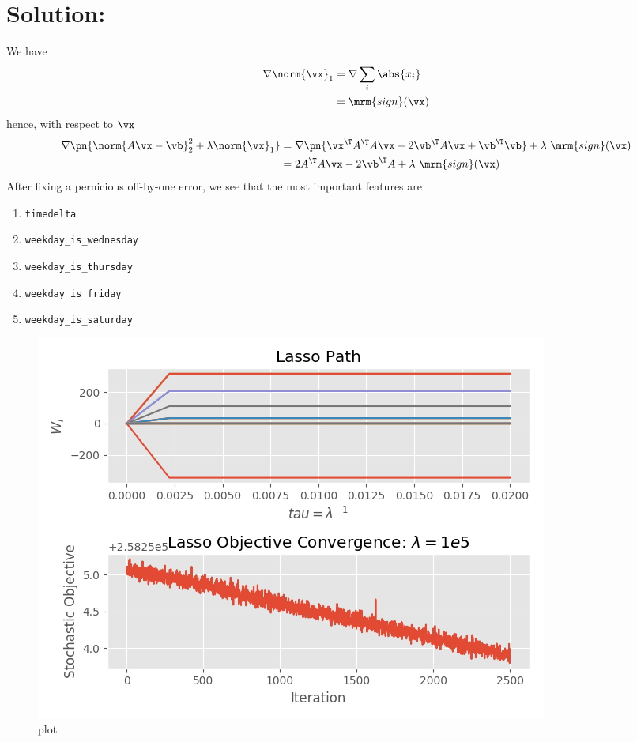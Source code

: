 \documentclass[189]{pset}
\begin{document}
  \hrulefill

  \section*{Solution:}
    We have
    \begin{align*}
      \nabla \norm{\vx}_1
      &= \nabla \sum_{i} \abs{x_i} \\
      &= \mrm{sign} (\vx)
    \end{align*}
    hence, with respect to $\vx$
    \begin{align*}
      \nabla \pn{\norm{A\vx - \vb}_2^2 + \lambda \norm{\vx}_1}
      &= \nabla \pn{\vx^\T A^\T A \vx - 2\vb^\T A \vx + \vb^\T \vb} +
        \lambda \ \mrm{sign}(\vx) \\
      &= 2 A^\T A \vx - 2\vb^\T A + \lambda\ \mrm{sign}(\vx)
    \end{align*}
    After fixing a pernicious off-by-one error, we see that the most
    important features are
    \begin{enumerate}[label=\arabic*.]
      \item \texttt{timedelta}
      \item \texttt{weekday\_is\_wednesday}
      \item \texttt{weekday\_is\_thursday}
      \item \texttt{weekday\_is\_friday}
      \item \texttt{weekday\_is\_saturday}
    \end{enumerate}

    \begin{figure}[H]
      \centering
      \includegraphics{hw7pr2_lasso.png}
      \caption{plot}
      \label{fig:w}
    \end{figure}
\end{document}
